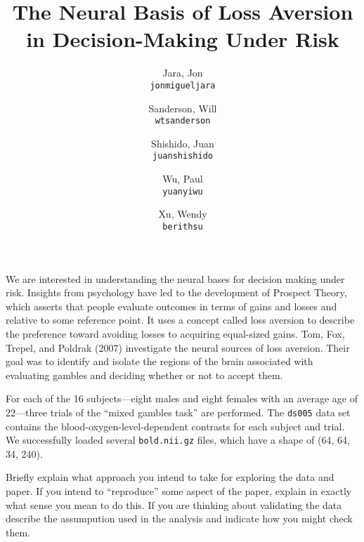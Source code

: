 \documentclass[11pt]{article}
\title{The Neural Basis of Loss Aversion in Decision-Making Under Risk}
\author{
  Jara, Jon\\
  \texttt{jonmigueljara}
  \and
  Sanderson, Will\\
  \texttt{wtsanderson}
  \and
  Shishido, Juan\\
  \texttt{juanshishido}
  \and
  Wu, Paul\\
  \texttt{yuanyiwu}
  \and
  Xu, Wendy\\
  \texttt{berithsu}
}
\begin{document}
\maketitle

We are interested in understanding the neural bases for decision making under
risk. Insights from psychology have led to the development of Prospect Theory,
which asserts that people evaluate outcomes in terms of gains and losses and
relative to some reference point\cite{kahnemantversky}. It uses a concept
called loss aversion to describe the preference toward avoiding losses to
acquiring equal-sized gains. Tom, Fox, Trepel, and Poldrak (2007) investigate
the neural sources of loss aversion. Their goal was to identify and isolate the
regions of the brain associated with evaluating gambles and deciding whether or
not to accept them.

For each of the 16 subjects---eight males and eight females with an average
age of 22---three trials of the ``mixed gambles task'' are performed. The
\lstinline{ds005} data set contains the blood-oxygen-level-dependent contrasts
for each subject and trial. We successfully loaded several
\lstinline{bold.nii.gz} files, which have a shape of (64, 64, 34, 240).

Briefly explain what approach you intend to take for exploring
the data and paper.  If you intend to ``reproduce'' some aspect of the paper,
explain in exactly what sense you mean to do this.  If you are thinking about
validating the data describe the assumpution used in the analysis and indicate
how you might check them.


\end{document}

